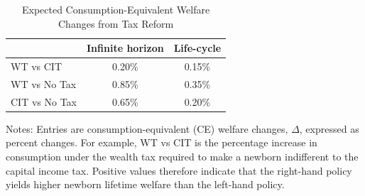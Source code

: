 \begin{table}[!htbp]
\centering
\caption{Expected Consumption-Equivalent Welfare Changes from Tax Reform}
\label{tab:ce_welfare_tax}
\begin{threeparttable}
\begin{tabular}{lcc}
\toprule
& \textbf{Infinite horizon} & \textbf{Life-cycle} \\
\midrule
WT vs CIT       & 0.20\% & 0.15\% \\
WT vs No Tax  & 0.85\% & 0.35\% \\
CIT vs No Tax & 0.65\% & 0.20\% \\
\bottomrule
\end{tabular}
\begin{tablenotes}[flushleft]
\footnotesize
\item Notes: Entries are consumption-equivalent (CE) welfare changes, $\Delta$, expressed as percent changes. For example, WT vs CIT is the percentage increase in consumption under the wealth tax required to make a newborn indifferent to the capital income tax. Positive values therefore indicate that the right-hand policy yields higher newborn lifetime welfare than the left-hand policy.
\end{tablenotes}
\end{threeparttable}
\end{table}
